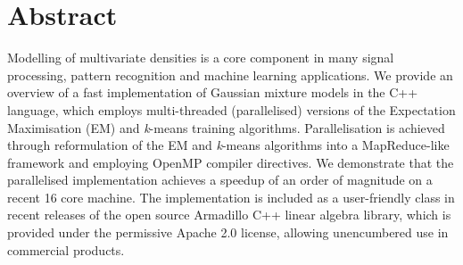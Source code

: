 \section*{Abstract}

Modelling of multivariate densities is a core component in many signal processing, pattern recognition and machine learning applications.
We provide an overview of a fast implementation of Gaussian mixture models in the C++ language,
which employs multi-threaded (parallelised) versions of the Expectation Maximisation (EM) and {\it k}-means training algorithms.
Parallelisation is achieved through reformulation of the EM and {\it k}-means algorithms into a MapReduce-like framework
and employing OpenMP compiler directives.
We demonstrate that the parallelised implementation achieves a speedup of an order of magnitude on a recent 16 core machine.
The implementation is included as a user-friendly class in recent releases of the open source Armadillo C++ linear algebra library,
which is provided under the permissive Apache 2.0 license, allowing unencumbered use in commercial products.
